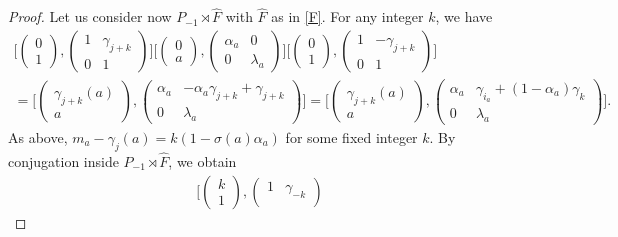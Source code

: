 \documentclass[10pt,a4paper]{amsart}
\begin{document}
\begin{proof}
Let us consider now  $P_{-1}\rtimes \hat F$ with $\hat F$ as in \eqref{F}. For any integer $k$, we have
		$$\begin{array}{l}
		\Big[\begin{pmatrix}
		0\\
		1
		\end{pmatrix},\begin{pmatrix}
		1 & \gamma_{j+k}\\
		0&1
		\end{pmatrix}\Big]\Big[\begin{pmatrix}
		0\\
		a
		\end{pmatrix},\begin{pmatrix}
		\alpha_a & 0\\
		0&\lambda_a
		\end{pmatrix}\Big]
\Big[\begin{pmatrix}
		0\\
		1
		\end{pmatrix},\begin{pmatrix}
		1 & -\gamma_{j+k}\\
		0&1
		\end{pmatrix}\Big]\\[12pt]
=\Big[\begin{pmatrix}
		\gamma_{j+k}(a)\\
		a
		\end{pmatrix},\begin{pmatrix}
		\alpha_a & -\alpha_a\gamma_{j+k}+\gamma_{j+k}\\
		0&\lambda_a
		\end{pmatrix}\Big]
=\Big[\begin{pmatrix}
		\gamma_{j+k}(a)\\
		a
		\end{pmatrix},\begin{pmatrix}
		\alpha_a & \gamma_{i_a}+(1-\alpha_a)\gamma_k\\
		0&\lambda_a
		\end{pmatrix}\Big].
\end{array}
		$$
As above, $m_a-\gamma_j(a)=k(1-\sigma(a)\alpha_a)$ for some fixed integer $k$. By conjugation inside $P_{-1} \rtimes \hat F$, we obtain
		$$\begin{array}{l}
		\Big[\begin{pmatrix}
		k\\
		1
		\end{pmatrix},\begin{pmatrix}
		1 & \gamma_{-k}\\

\end{pmatrix}
\end{array}$$
\end{proof}
\end{document}
